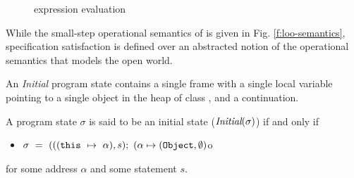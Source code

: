 \begin{figure}[t]
\begin{minipage}{\textwidth}
\begin{minipage}{\textwidth}
\caption{\LangOO expression evaluation}
\label{f:evaluation}
\end{minipage}
\end{minipage}
\end{figure}

While the small-step operational semantics of \LangOO is given in Fig. \ref{f:loo-semantics},
specification satisfaction is defined over an abstracted notion of 
the operational semantics that models the open world. %




An \emph{Initial} program state contains a single frame 
with a single local variable  pointing to a single object 
in the heap of class , and a continuation.
\begin{definition}
\label{def:initial}
A program state $\sigma$ is said to be an initial state ($\textit{Initial}(\sigma)$)
if and only if
\begin{itemize}
\item
$\sigma\ =\  ( ((\prg{this}\ \mapsto\ \alpha), s); \  (\alpha \mapsto (\prg{Object}, \emptyset)$o
\end{itemize} 
for some address $\alpha$ and some statement $s$.
\end{definition}


